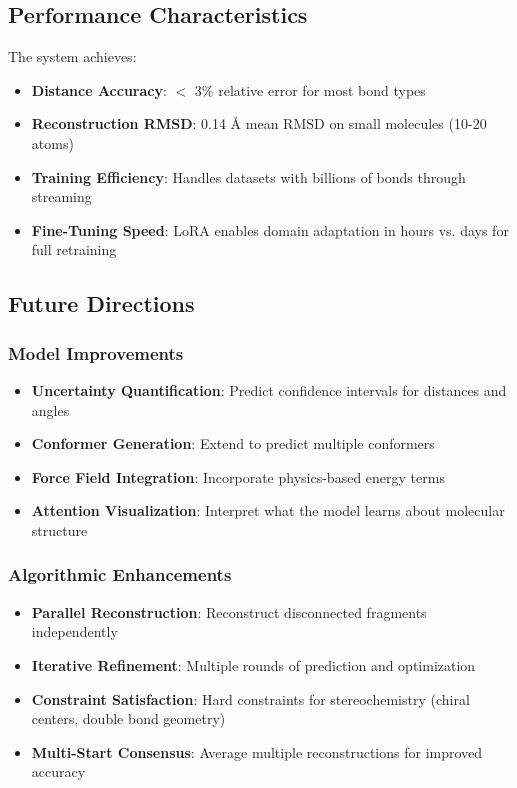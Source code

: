 \documentclass[11pt,a4paper]{article}
\begin{document}
\subsection{Performance Characteristics}

The system achieves:
\begin{itemize}
    \item \textbf{Distance Accuracy}: $<$ 3\% relative error for most bond types
    \item \textbf{Reconstruction RMSD}: 0.14 Å mean RMSD on small molecules (10-20 atoms)
    \item \textbf{Training Efficiency}: Handles datasets with billions of bonds through streaming
    \item \textbf{Fine-Tuning Speed}: LoRA enables domain adaptation in hours vs. days for full retraining
\end{itemize}

\subsection{Future Directions}

\subsubsection{Model Improvements}

\begin{itemize}
    \item \textbf{Uncertainty Quantification}: Predict confidence intervals for distances and angles
    \item \textbf{Conformer Generation}: Extend to predict multiple conformers
    \item \textbf{Force Field Integration}: Incorporate physics-based energy terms
    \item \textbf{Attention Visualization}: Interpret what the model learns about molecular structure
\end{itemize}

\subsubsection{Algorithmic Enhancements}

\begin{itemize}
    \item \textbf{Parallel Reconstruction}: Reconstruct disconnected fragments independently
    \item \textbf{Iterative Refinement}: Multiple rounds of prediction and optimization
    \item \textbf{Constraint Satisfaction}: Hard constraints for stereochemistry (chiral centers, double bond geometry)
    \item \textbf{Multi-Start Consensus}: Average multiple reconstructions for improved accuracy
\end{itemize}
\end{document}
